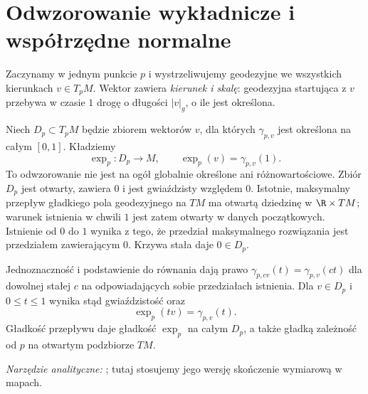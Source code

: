 \section{Odwzorowanie wykładnicze i współrzędne normalne}
\label{sec:exp-normalne}

Zaczynamy w jednym punkcie $p$ i wystrzeliwujemy
geodezyjne we wszystkich kierunkach $v\in T_pM$.
Wektor zawiera \emph{kierunek i skalę}: geodezyjna
startująca z $v$ przebywa w czasie $1$ drogę
o długości $|v|_g$, o ile jest określona.

\begin{definicja}
\label{def:exp-geodezyjna}
Niech $D_p\subset T_pM$ będzie zbiorem wektorów
$v$, dla których $\gamma_{p,v}$ jest określona
na całym $[0,1]$. Kładziemy
\begin{equation}\label{eq:exp-definicja}
 \exp_p:D_p\longrightarrow M,
 \qquad \exp_p(v)=\gamma_{p,v}(1).
\end{equation}
To odwzorowanie nie jest na ogół globalnie
określone ani różnowartościowe. Zbiór $D_p$ jest otwarty,
zawiera $0$ i jest gwiaździsty względem $0$. Istotnie,
maksymalny przepływ gładkiego pola geodezyjnego na $TM$
ma otwartą dziedzinę w $\R\times TM$; warunek istnienia
w chwili $1$ jest zatem otwarty w danych początkowych.
Istnienie od $0$ do $1$ wynika z tego, że przedział
maksymalnego rozwiązania jest przedziałem zawierającym $0$.
Krzywa stała daje $0\in D_p$.

Jednoznaczność i podstawienie do równania dają prawo
$\gamma_{p,cv}(t)=\gamma_{p,v}(ct)$ dla dowolnej stałej $c$
na odpowiadających sobie przedziałach istnienia.
Dla $v\in D_p$ i $0\leq t\leq1$ wynika stąd
gwiaździstość oraz
\begin{equation}\label{eq:exp-skalowanie}
 \exp_p(tv)=\gamma_{p,v}(t).
\end{equation}
Gładkość przepływu daje gładkość $\exp_p$ na całym $D_p$,
a także gładką zależność od $p$ na otwartym podzbiorze $TM$.
\end{definicja}

\noindent\emph{Narzędzie analityczne:} ; tutaj stosujemy jego wersję skończenie wymiarową w mapach.

